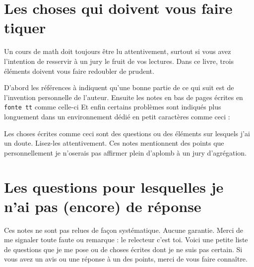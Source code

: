 
\section{Les choses qui doivent vous faire tiquer}

Un cours de math doit toujours être lu attentivement, surtout si vous avez l'intention de resservir à un jury le fruit de vos lectures. Dans ce livre, trois éléments doivent vous faire redoubler de prudent.

D'abord les références à \cite{MonCerveau} indiquent qu'une bonne partie de ce qui suit est de l'invention personnelle de l'auteur. Ensuite les notes en bas de pages écrites en \texttt{fonte tt} comme celle-ci Et enfin certains problèmes sont indiqués plus longuement dans un environnement dédié en petit caractères comme ceci :
\begin{probleme}
    Les choses écrites comme ceci sont des questions ou des éléments sur lesquels j'ai un doute. Lisez-les attentivement. Ces notes mentionnent des points que personnellement je n'oserais pas affirmer plein d'aplomb à un jury d'agrégation.
\end{probleme}

\section{Les questions pour lesquelles je n'ai pas (encore) de réponse}
\label{SecooCKWWooBFgnea}

Ces notes ne sont pas relues de façon systématique. Aucune garantie. Merci de me signaler toute faute ou remarque : le relecteur c'est toi. Voici une petite liste de questions que je me pose ou de choses écrites dont je ne suis pas certain. Si vous avez un avis ou une réponse à un des points, merci de vous faire connaître.

